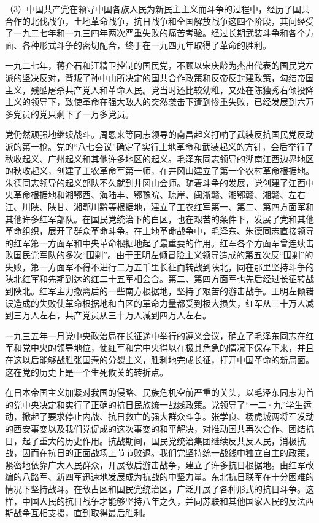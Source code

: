 （3）中国共产党在领导中国各族人民为新民主主义而斗争的过程中，经历了国共合作的北伐战争，土地革命战争，抗日战争和全国解放战争这四个阶段，其间经受了一九二七年和一九三四年两次严重失败的痛苦考验。经过长期武装斗争和各个方面、各种形式斗争的密切配合，终于在一九四九年取得了革命的胜利。

一九二七年，蒋介石和汪精卫控制的国民党，不顾以宋庆龄为杰出代表的国民党左派的坚决反对，背叛了孙中山所决定的国共合作政策和反帝反封建政策，勾结帝国主义，残酷屠杀共产党人和革命人民。党当时还比较幼稚，又处在陈独秀右倾投降主义的领导下，致使革命在强大敌人的突然袭击下遭到惨重失败，已经发展到六万多党员的党只剩下了一万多党员。

党仍然顽强地继续战斗。周恩来等同志领导的南昌起义打响了武装反抗国民党反动派的第一枪。党的“八七会议”确定了实行土地革命和武装起义的方针，会后举行了秋收起义、广州起义和其他许多地区的起义。毛泽东同志领导的湖南江西边界地区的秋收起义，创建了工农革命军第一师，在井冈山建立了第一个农村革命根据地。朱德同志领导的起义部队不久就到井冈山会师。随着斗争的发展，党创建了江西中央革命根据地和湘鄂西、海陆丰、鄂豫皖、琼崖、闽浙赣、湘鄂赣、湘赣、左右江、川陕、陕甘、湘鄂川黔等根据地，建立了工农红军第一、第二、第四方面军和其他许多红军部队。在国民党统治下的白区，也在艰苦的条件下，发展了党和其他革命组织，展开了群众革命斗争。在土地革命战争中，毛泽东、朱德同志直接领导的红军第一方面军和中央革命根据地起了最重要的作用。红军各个方面军曾连续击败国民党军队的多次“围剿”。由于王明左倾冒险主义领导造成的第五次反“围剿”的失败，第一方面军不得不进行二万五千里长征而转战到陕北，同在那里坚持斗争的陕北红军和先期到达的红二十五军相会合。第二、第四方面军也先后经过长征转战到陕北。红军主力撤离后的一些南方根据地，坚持了艰苦的游击战争。王明左倾错误造成的失败使革命根据地和白区的革命力量都受到极大损失，红军从三十万人减到三万人左右，共产党员从三十万人减到四万人左右。

一九三五年一月党中央政治局在长征途中举行的遵义会议，确立了毛泽东同志在红军和党中央的领导地位，使红军和党中央得以在极其危急的情况下保存下来，并且在这以后能够战胜张国焘的分裂主义，胜利地完成长征，打开中国革命的新局面。这在党的历史上是一个生死攸关的转折点。

在日本帝国主义加紧对我国的侵略、民族危机空前严重的关头，以毛泽东同志为首的党中央决定和实行了正确的抗日民族统一战线政策。党领导了“一二·九”学生运动，掀起了要求停止内战、抗日救亡的强大群众斗争。张学良、杨虎城两将军发动的西安事变以及我们党促成的这次事变的和平解决，对推动国共再次合作、团结抗日，起了重大的历史作用。抗战期间，国民党统治集团继续反共反人民，消极抗战，因而在抗日的正面战场上节节败退。我们党坚持统一战线中独立自主的政策，紧密地依靠广大人民群众，开展敌后游击战争，建立了许多抗日根据地。由红军改编的八路军、新四军迅速地发展成为抗战的中坚力量。东北抗日联军在十分困难的情况下坚持战斗。在敌占区和国民党统治区，广泛开展了各种形式的抗日斗争。这样，中国人民的抗日战争才能够坚持八年之久，并同苏联和其他国家人民的反法西斯战争互相支援，直到取得最后胜利。


